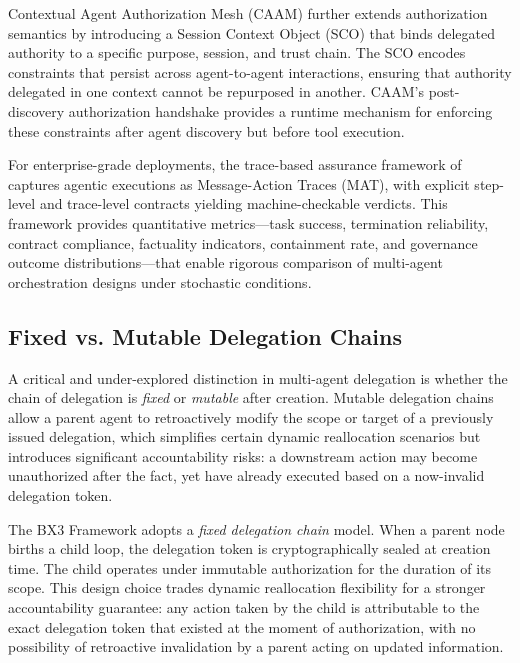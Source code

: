 Contextual Agent Authorization Mesh (CAAM) \cite{draft-barney-caam} further extends authorization semantics by introducing a Session Context Object (SCO) that binds delegated authority to a specific purpose, session, and trust chain. The SCO encodes constraints that persist across agent-to-agent interactions, ensuring that authority delegated in one context cannot be repurposed in another. CAAM's post-discovery authorization handshake provides a runtime mechanism for enforcing these constraints after agent discovery but before tool execution.

For enterprise-grade deployments, the trace-based assurance framework of  captures agentic executions as Message-Action Traces (MAT), with explicit step-level and trace-level contracts yielding machine-checkable verdicts. This framework provides quantitative metrics---task success, termination reliability, contract compliance, factuality indicators, containment rate, and governance outcome distributions---that enable rigorous comparison of multi-agent orchestration designs under stochastic conditions.

\subsection{Fixed vs. Mutable Delegation Chains}

A critical and under-explored distinction in multi-agent delegation is whether the chain of delegation is \emph{fixed} or \emph{mutable} after creation. Mutable delegation chains allow a parent agent to retroactively modify the scope or target of a previously issued delegation, which simplifies certain dynamic reallocation scenarios but introduces significant accountability risks: a downstream action may become unauthorized after the fact, yet have already executed based on a now-invalid delegation token.

The BX3 Framework adopts a \emph{fixed delegation chain} model. When a parent node births a child loop, the delegation token is cryptographically sealed at creation time. The child operates under immutable authorization for the duration of its scope. This design choice trades dynamic reallocation flexibility for a stronger accountability guarantee: any action taken by the child is attributable to the exact delegation token that existed at the moment of authorization, with no possibility of retroactive invalidation by a parent acting on updated information.

